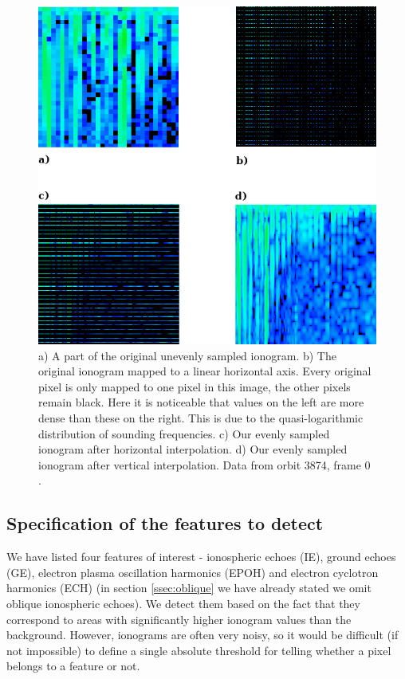 \begin{figure}[H]
	\centering
	\includegraphics[width=140mm]{images/even_and_uneven_ionogram.png}
	\caption{a) A part of the original unevenly sampled ionogram. b) The original ionogram mapped to a linear horizontal axis. Every original pixel is only mapped to one pixel in this image, the other pixels remain black. Here it is noticeable that values on the left are more dense than these on the right. This is due to the quasi-logarithmic distribution of sounding frequencies. c) Our evenly sampled ionogram after horizontal interpolation. d) Our evenly sampled ionogram after vertical interpolation. Data from orbit 3874, frame 0 \citep{FTP}.}
	\label{fig:even_uneven_iono}
\end{figure}

\subsection{Specification of the features to detect}
We have listed four features of interest - ionospheric echoes (IE), ground echoes (GE), electron plasma oscillation harmonics (EPOH) and electron cyclotron harmonics (ECH) (in section \ref{ssec:oblique} we have already stated we omit oblique ionospheric echoes). We detect them based on the fact that they correspond to areas with significantly higher ionogram values than the background. However, ionograms are often very noisy, so it would be difficult (if not impossible) to define a single absolute threshold for telling whether a pixel belongs to a feature or not. 

